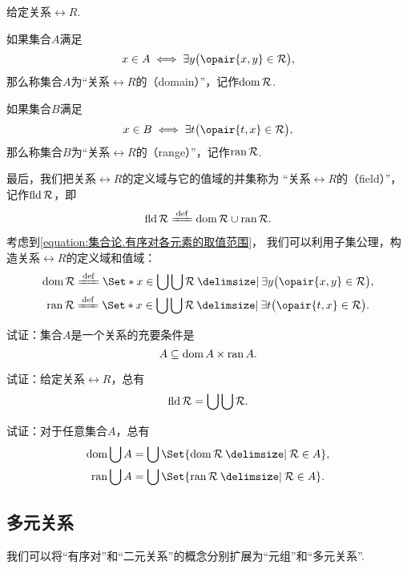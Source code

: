 \begin{definition}
给定关系\(\rel{R}\).

如果集合\(A\)满足\[
	x \in A \iff \exists y \bigl( \opair{x,y} \in \rel{R} \bigr),
\]
那么称集合\(A\)为“关系\(\rel{R}\)的（domain）”，记作\(\operatorname{dom} \mathcal{R}\).

如果集合\(B\)满足\[
	x \in B \iff \exists t \bigl( \opair{t,x} \in \rel{R} \bigr),
\]
那么称集合\(B\)为“关系\(\rel{R}\)的（range）”，记作\(\operatorname{ran} \mathcal{R}\).

最后，我们把关系\(\rel{R}\)的定义域与它的值域的并集称为
“关系\(\rel{R}\)的（field）”，记作\(\operatorname{fld} \mathcal{R}\)，即\[
	\fld \rel{R} \defeq \dom \rel{R} \cup \ran \rel{R}.
\]
\end{definition}

考虑到\cref{equation:集合论.有序对各元素的取值范围}，
我们可以利用子集公理，构造关系\(\rel{R}\)的定义域和值域：
\begin{gather}
	\dom \rel{R}
	\defeq
	\Set*{ x \in \bigcup\bigcup\rel{R} \given \exists y \bigl( \opair{x,y} \in \rel{R} \bigr) }, \\
	\ran \rel{R}
	\defeq
	\Set*{ x \in \bigcup\bigcup\rel{R} \given \exists t \bigl( \opair{t,x} \in \rel{R} \bigr) }.
\end{gather}

\begin{example}
试证：集合\(A\)是一个关系的充要条件是\[
	A \subseteq \operatorname{dom} A \times \operatorname{ran} A.
\]
\end{example}

\begin{example}
试证：给定关系\(\rel{R}\)，总有\[
	\operatorname{fld} \mathcal{R} = \bigcup\bigcup \mathcal{R}.
\]
\end{example}

\begin{example}
试证：对于任意集合\(A\)，总有\begin{gather}
	\dom\bigcup A = \bigcup\Set{ \dom\rel{R} \given \rel{R} \in A }, \\
	\ran\bigcup A = \bigcup\Set{ \ran\rel{R} \given \rel{R} \in A }.
\end{gather}
\end{example}

\subsection{多元关系}
我们可以将“有序对”和“二元关系”的概念分别扩展为“元组”和“多元关系”.

